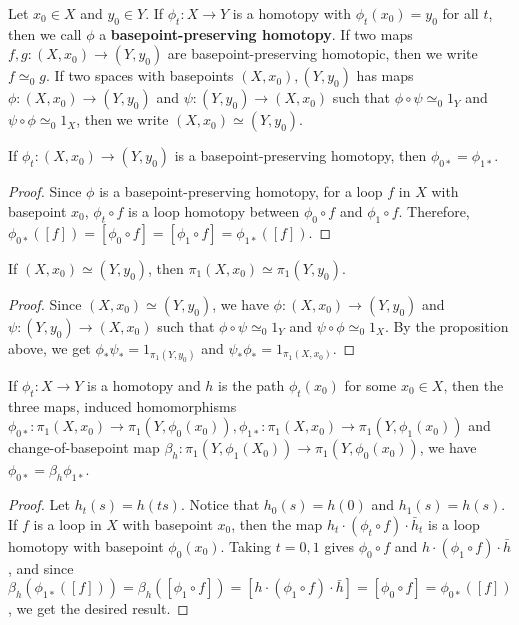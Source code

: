 \begin{defn} Let $x_0\in X$ and $y_0\in Y$. If $\phi_t:X\rightarrow Y$ is a homotopy with $\phi_t(x_0)=y_0$ for all $t$, then we call $\phi$ a \textbf{basepoint-preserving homotopy}. If two maps $f,g:(X,x_0)\rightarrow (Y,y_0)$ are basepoint-preserving homotopic, then we write $f\simeq_0 g$. If two spaces with basepoints $(X,x_0), (Y,y_0)$ has maps $\phi:(X,x_0)\rightarrow (Y,y_0)$ and $\psi:(Y,y_0)\rightarrow (X,x_0)$ such that $\phi\circ \psi\simeq_0 1_{Y}$ and $\psi\circ \phi\simeq_0 1_X$, then we write $(X,x_0)\simeq (Y,y_0)$.
\end{defn}
\begin{prop} If $\phi_t:(X,x_0)\rightarrow (Y,y_0)$ is a basepoint-preserving homotopy, then $\phi_{0*}=\phi_{1*}$.
\end{prop}
\begin{proof}
Since $\phi$ is a basepoint-preserving homotopy, for a loop $f$ in $X$ with basepoint $x_0$, $\phi_t\circ f$ is a loop homotopy between $\phi_0\circ f$ and $\phi_1\circ f$. Therefore, $\phi_{0*}([f])=[\phi_0\circ f]=[\phi_1\circ f]=\phi_{1*}([f])$.
\end{proof}
\begin{cor} If $(X,x_0)\simeq (Y,y_0)$, then $\pi_1(X,x_0)\simeq \pi_1(Y,y_0)$.
\end{cor}
\begin{proof}
Since $(X,x_0)\simeq (Y,y_0)$, we have $\phi:(X,x_0)\rightarrow (Y,y_0)$ and $\psi:(Y,y_0)\rightarrow (X,x_0)$ such that $\phi\circ \psi\simeq_0 1_{Y}$ and $\psi\circ \phi\simeq_0 1_X$. By the proposition above, we get $\phi_*\psi_*=1_{\pi_1(Y,y_0)}$ and $\psi_*\phi_*=1_{\pi_1(X,x_0)}$.
\end{proof}

\begin{lemma} If $\phi_t:X\rightarrow Y$ is a homotopy and $h$ is the path $\phi_t(x_0)$ for some $x_0\in X$, then the three maps, induced homomorphisms $\phi_{0*}:\pi_1(X,x_0)\rightarrow \pi_1(Y,\phi_0(x_0)),\phi_{1*}:\pi_1(X,x_0)\rightarrow \pi_1(Y,\phi_1(x_0))$ and change-of-basepoint map $\beta_h:\pi_1(Y,\phi_1(X_0))\rightarrow \pi_1(Y,\phi_0(x_0))$, we have $\phi_{0*}=\beta_h \phi_{1*}$.
\end{lemma}
\begin{proof}
Let $h_t(s)=h(ts)$. Notice that $h_0(s)=h(0)$ and $h_1(s)=h(s)$. If $f$ is a loop in $X$ with basepoint $x_0$, then the map $h_t\cdot(\phi_t \circ f)\cdot \bar{h}_t$ is a loop homotopy with basepoint $\phi_0(x_0)$. Taking $t=0,1$ gives $\phi_0\circ f$ and $h\cdot(\phi_1\circ f)\cdot \bar{h}$, and since $\beta_h(\phi_{1*}([f]))=\beta_h([\phi_1\circ f])=[h\cdot (\phi_1\circ f)\cdot \bar{h}]=[\phi_0\circ f]=\phi_{0*}([f])$, we get the desired result.
\end{proof}

